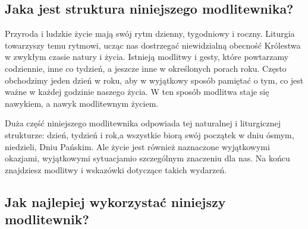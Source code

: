 ﻿\documentclass[9pt,twoside]{extarticle}
\begin{document}
\subsection*{Jaka jest struktura niniejszego modlitewnika?}


{\hnr Przyroda i ludzkie życie mają swój rytm dzienny, tygodniowy i roczny. Liturgia towarzyszy temu rytmowi, ucząc nas dostrzegać niewidzialną obecność Królestwa w zwykłym czasie natury i życia. Istnieją modlitwy i gesty, które powtarzamy codziennie, inne co tydzień, a jeszcze inne w określonych porach roku. Często obchodzimy jeden dzień w roku, aby w wyjątkowy sposób pamiętać o tym, co jest ważne w każdej godzinie naszego życia. W ten sposób modlitwa staje się nawykiem, a nawyk modlitewnym życiem.


Duża część niniejszego modlitewnika odpowiada tej naturalnej i liturgicznej strukturze: dzień, tydzień i rok,\linebreak a wszystkie biorą swój początek w dniu ósmym, niedzieli, Dniu Pańskim. Ale życie jest również naznaczone wyjątkowymi okazjami, wyjątkowymi sytuacjami\linebreak o szczególnym znaczeniu dla nas. Na końcu znajdziesz modlitwy i wskazówki dotyczące takich wydarzeń.}


\vspace{\fill}


\subsection*{Jak najlepiej wykorzystać niniejszy modlitewnik?}
\end{document}
